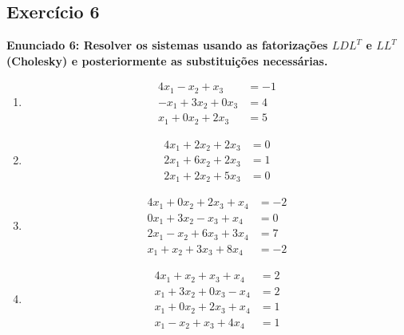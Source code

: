 \documentclass{article}
\begin{document}
\subsection*{Exerc\'icio 6}
\textbf{Enunciado 6: Resolver os sistemas usando as fatoriza\c{c}\~oes $LDL^T$ e $LL^T$ (Cholesky) e posteriormente as substitui\c{c}\~oes necess\'arias.}
\begin{enumerate}
    \item 
    \[
        \begin{aligned}
            4x_1 - x_2 + x_3 &= -1 \\
            -x_1 + 3x_2 + 0x_3 &= 4 \\
            x_1 + 0x_2 + 2x_3 &= 5
        \end{aligned}
    \]
    \item 
    \[
        \begin{aligned}
            4x_1 + 2x_2 + 2x_3 &= 0 \\
            2x_1 + 6x_2 + 2x_3 &= 1 \\
            2x_1 + 2x_2 + 5x_3 &= 0
        \end{aligned}
    \]
    \item 
    \[
        \begin{aligned}
            4x_1 + 0x_2 + 2x_3 + x_4 &= -2 \\
            0x_1 + 3x_2 - x_3 + x_4 &= 0 \\
            2x_1 - x_2 + 6x_3 + 3x_4 &= 7 \\
            x_1 + x_2 + 3x_3 + 8x_4 &= -2
        \end{aligned}
    \]
    \item 
    \[
        \begin{aligned}
            4x_1 + x_2 + x_3 + x_4 &= 2 \\
            x_1 + 3x_2 + 0x_3 - x_4 &= 2 \\
            x_1 + 0x_2 + 2x_3 + x_4 &= 1 \\
            x_1 - x_2 + x_3 + 4x_4 &= 1
        \end{aligned}
    \]
\end{enumerate}
\end{document}
